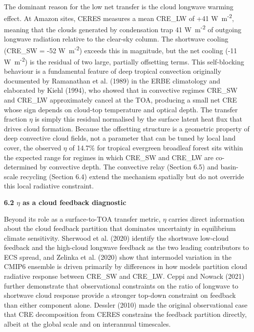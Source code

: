 The dominant reason for the low net transfer is the cloud longwave warming effect. At Amazon sites, CERES measures a mean CRE\_LW of +41 W~m\textsuperscript{-2}, meaning that the clouds generated by condensation trap 41 W~m\textsuperscript{-2} of outgoing longwave radiation relative to the clear-sky column. The shortwave cooling (CRE\_SW = -52 W~m\textsuperscript{-2}) exceeds this in magnitude, but the net cooling (-11 W~m\textsuperscript{-2}) is the residual of two large, partially offsetting terms. This self-blocking behaviour is a fundamental feature of deep tropical convection originally documented by Ramanathan et al. (1989) in the ERBE climatology and elaborated by Kiehl (1994), who showed that in convective regimes CRE\_SW and CRE\_LW approximately cancel at the TOA, producing a small net CRE whose sign depends on cloud-top temperature and optical depth. The transfer fraction \(\eta\) is simply this residual normalised by the surface latent heat flux that drives cloud formation. Because the offsetting structure is a geometric property of deep convective cloud fields, not a parameter that can be tuned by local land cover, the observed \(\eta\) of 14.7\% for tropical evergreen broadleaf forest sits within the expected range for regimes in which CRE\_SW and CRE\_LW are co-determined by convective depth. The convective relay (Section 6.5) and basin-scale recycling (Section 6.4) extend the mechanism spatially but do not override this local radiative constraint.

\textbf{6.2 \(\eta\) as a cloud feedback diagnostic}

Beyond its role as a surface-to-TOA transfer metric, \(\eta\) carries direct information about the cloud feedback partition that dominates uncertainty in equilibrium climate sensitivity. Sherwood et al. (2020) identify the shortwave low-cloud feedback and the high-cloud longwave feedback as the two leading contributors to ECS spread, and Zelinka et al. (2020) show that intermodel variation in the CMIP6 ensemble is driven primarily by differences in how models partition cloud radiative response between CRE\_SW and CRE\_LW. Ceppi and Nowack (2021) further demonstrate that observational constraints on the ratio of longwave to shortwave cloud response provide a stronger top-down constraint on feedback than either component alone. Dessler (2010) made the original observational case that CRE decomposition from CERES constrains the feedback partition directly, albeit at the global scale and on interannual timescales.


